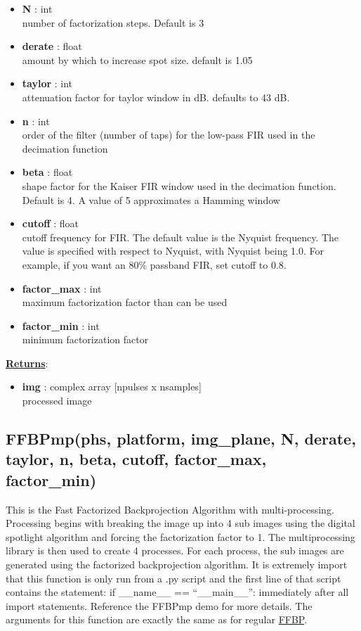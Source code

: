 \documentclass{article}
\newcommand{\defs}[2]{\textbf{{#1}} : {#2}}
\begin{document}
\begin{itemize}
\begin{itemize}
	\end{itemize}
	\item\defs{N}{int}\\
	number of factorization steps.  Default is 3
	\item\defs{derate}{float}\\
	amount by which to increase spot size. default is 1.05
	\item\defs{taylor}{int}\\
	attenuation factor for taylor window in dB.  defaults to 43 dB.
	\item\defs{n}{int}\\
	order of the filter (number of taps) for the low-pass FIR used in the decimation function
	\item\defs{beta}{float}\\
	shape factor for the Kaiser FIR window used in the decimation function.  Default is 4. A value of 5 approximates a Hamming window \cite{scipy_kaiser}
	\item\defs{cutoff}{float}\\
	cutoff frequency for FIR.  The default value is the Nyquist frequency.  The value is specified with respect to Nyquist, with Nyquist being 1.0.  For example, if you want an 80\% passband FIR, set cutoff to 0.8.
	\item\defs{factor\_max}{int}\\
	maximum factorization factor than can be used
	\item\defs{factor\_min}{int}\\
	minimum factorization factor
\end{itemize}

\noindent \underline{\textbf{Returns}}:
\begin{itemize}
	\item \defs{img}{complex array [npulses x nsamples]}\\
	processed image
\end{itemize}

\subsection{FFBPmp(phs, platform, img\_plane, N, derate, taylor, n, beta, cutoff, factor\_max, factor\_min)}
This is the Fast Factorized Backprojection Algorithm with multi-processing.  Processing begins with breaking the image up into 4 sub images using the digital spotlight algorithm and forcing the factorization factor to 1.  The multiprocessing library is then used to create 4 processes.  For each process, the sub images are generated using the factorized backprojection algorithm.  It is extremely import that this function is only run from a .py script and the first line of that script contains the statement: if \_\_name\_\_ == ``\_\_main\_\_'': immediately after all import statements.  Reference the FFBPmp demo for more details.  The arguments for this function are exactly the same as for regular \hyperref[sec:FFBP]{FFBP}.
\end{document}
